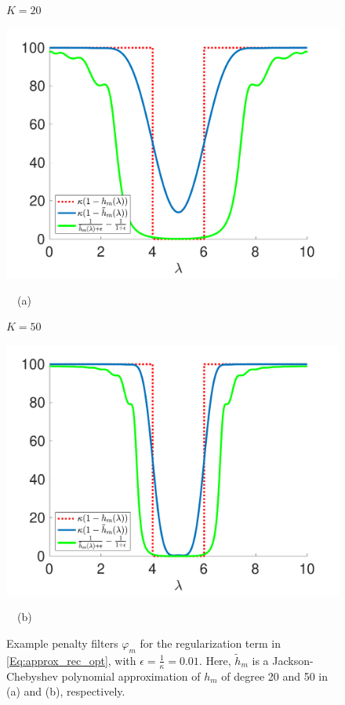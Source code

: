 \documentclass[journal, 10pt]{IEEEtran}
\begin{document}
\begin{figure}[tb]
\begin{minipage}[m]{0.49\linewidth}
\centerline{\small{$K=20$}}
\centerline{\includegraphics[width=1.1\linewidth]{fig_reg_filters_20}}
\centerline{~~\small{(a)}}
\end{minipage}
\begin{minipage}[m]{0.49\linewidth}
\centerline{\small{$K=50$}}
\centerline{\includegraphics[width=1.1\linewidth]{fig_reg_filters_50}}
\centerline{~~\small{(b)}}
\end{minipage} 
\caption{Example penalty filters $\varphi_m$ for the regularization term in \eqref{Eq:approx_rec_opt}, with $\epsilon=\frac{1}{\kappa}=0.01$. Here, $\tilde{h}_m$ is a Jackson-Chebyshev polynomial approximation of $h_m$ of degree 20 and 50 in (a) and (b), respectively.}\label{Fig:penalty}
\end{figure}
\end{document}
